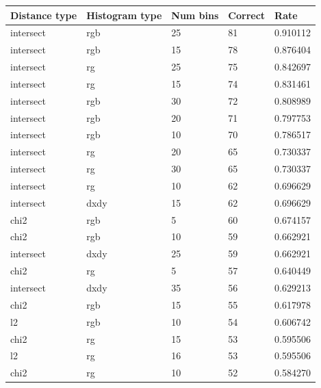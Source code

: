 \documentclass{article}
\begin{document}
\begin{longtable}{|l|l|l|l|l|}
    \hline
    \textbf{Distance type} & \textbf{Histogram type} & \textbf{Num bins} & \textbf{Correct} & \textbf{Rate}     \\ \hline
    intersect     & rgb            & 25       & 81      & 0.910112 \\ \hline
    intersect     & rgb            & 15       & 78      & 0.876404 \\ \hline
    intersect     & rg             & 25       & 75      & 0.842697 \\ \hline
    intersect     & rg             & 15       & 74      & 0.831461 \\ \hline
    intersect     & rgb            & 30       & 72      & 0.808989 \\ \hline
    intersect     & rgb            & 20       & 71      & 0.797753 \\ \hline
    intersect     & rgb            & 10       & 70      & 0.786517 \\ \hline
    intersect     & rg             & 20       & 65      & 0.730337 \\ \hline
    intersect     & rg             & 30       & 65      & 0.730337 \\ \hline
    intersect     & rg             & 10       & 62      & 0.696629 \\ \hline
    intersect     & dxdy           & 15       & 62      & 0.696629 \\ \hline
    chi2          & rgb            & 5        & 60      & 0.674157 \\ \hline
    chi2          & rgb            & 10       & 59      & 0.662921 \\ \hline
    intersect     & dxdy           & 25       & 59      & 0.662921 \\ \hline
    chi2          & rg             & 5        & 57      & 0.640449 \\ \hline
    intersect     & dxdy           & 35       & 56      & 0.629213 \\ \hline
    chi2          & rgb            & 15       & 55      & 0.617978 \\ \hline
    l2            & rgb            & 10       & 54      & 0.606742 \\ \hline
    chi2          & rg             & 15       & 53      & 0.595506 \\ \hline
    l2            & rg             & 16       & 53      & 0.595506 \\ \hline
    chi2          & rg             & 10       & 52      & 0.584270 \\ \hline

\end{longtable}
\end{document}
